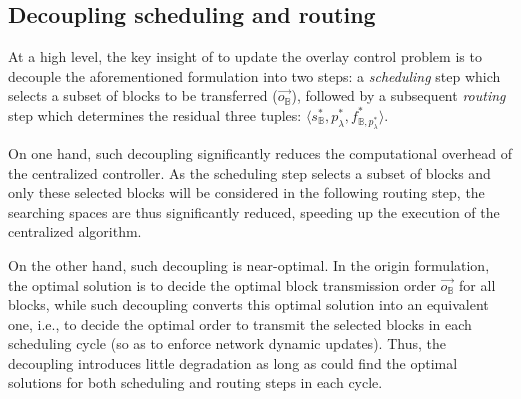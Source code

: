 

\subsection{Decoupling scheduling and routing}
\label{subsec:logic:separation}

At a high level, the key insight of \name to update the overlay control problem is
to decouple the aforementioned formulation into two steps:
a {\em scheduling} step which selects a subset of blocks to be transferred
($\overrightarrow{o_\mathbb{B}}$), followed by a subsequent {\em routing}
step which determines the residual three tuples: $\langle s_{\mathbb{B}}^*, p_{\lambda}^*, f^*_{\mathbb{B},p_{\lambda}^*} \rangle$. %

On one hand, such decoupling significantly reduces the computational overhead of the centralized controller. As the scheduling step selects a subset of blocks and only these selected blocks will be considered in the following routing step, the searching spaces are thus significantly reduced, speeding up the execution of the centralized algorithm.

On the other hand, such decoupling is near-optimal. In the origin formulation, the optimal solution is to decide the optimal block transmission order $\overrightarrow{o_\mathbb{B}}$ for all blocks, while such decoupling converts this optimal solution into an equivalent one, i.e., to decide the optimal order to transmit the selected blocks in each scheduling cycle (so as to enforce network dynamic updates). Thus, the decoupling introduces little degradation as long as \name could find the optimal solutions for both scheduling and routing steps in each cycle.

